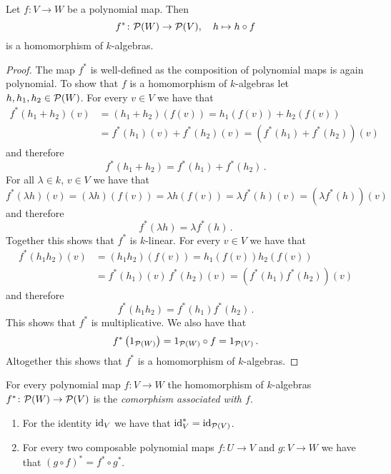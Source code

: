 \begin{lemma}
  Let $f \colon V \to W$ be a polynomial map. Then
  \[
            f^*
    \colon  \mathcal{P}(W)
    \to     \mathcal{P}(V),
    \quad   h
    \mapsto h \circ f
  \]
  is a homomorphism of $k$-algebras.
\end{lemma}
\begin{proof}
  The map $f^*$ is well-defined as the composition of polynomial maps is again polynomial.
  To show that $f$ is a homomorphism of $k$-algebras let $h, h_1, h_2 \in \mathcal{P}(W)$.
  For every $v \in V$ we have that
  \begin{align*}
        f^*(h_1+h_2)(v)
    &=  (h_1 + h_2)(f(v))
     =  h_1(f(v)) + h_2(f(v)) \\
    &=  f^*(h_1)(v) + f^*(h_2)(v)
     =  (f^*(h_1)+f^*(h_2))(v)
  \end{align*}
  and therefore
  \[
      f^*(h_1 + h_2)
    = f^*(h_1) + f^*(h_2) \,.
  \]
  For all $\lambda \in k$, $v \in V$ we have that
  \[
      f^*(\lambda h)(v)
    = (\lambda h)(f(v))
    = \lambda h(f(v))
    = \lambda f^*(h)(v)
    = (\lambda f^*(h))(v)
  \]
  and therefore
  \[
      f^*(\lambda h)
    = \lambda f^*(h) \,.
  \]
  Together this shows that $f^*$ is $k$-linear.
  For every $v \in V$ we have that
  \begin{align*}
        f^*(h_1 h_2)(v)
    &=  (h_1 h_2)(f(v))
     =  h_1(f(v)) h_2(f(v)) \\
    &=  f^*(h_1)(v) \, f^*(h_2)(v)
     =  (f^*(h_1) f^*(h_2))(v)
  \end{align*}
  and therefore
  \[
      f^*(h_1 h_2)
    = f^*(h_1) f^*(h_2) \,.
  \]
  This shows that $f^*$ is multiplicative.
  We also have that
  \[
      f^*\left( 1_{\mathcal{P}(W)} \right)
    = 1_{\mathcal{P}(W)} \circ f
    = 1_{\mathcal{P}(V)} \,.
  \]
  Altogether this shows that $f^*$ is a homomorphism of $k$-algebras.
\end{proof}


\begin{definition}
  For every polynomial map $f \colon V \to W$ the homomorphism of $k$-algebras $f^* \colon \mathcal{P}(W) \to \mathcal{P}(V)$ is the \emph{comorphism associated with $f$}.
\end{definition}


\begin{lemma}
  \label{lemma: functoriality of polynomial algebra}
  \leavevmode
  \begin{enumerate}
    \item
      For the identity $\operatorname{id}_V$ we have that $\operatorname{id}_V^* = \operatorname{id}_{\mathcal{P}(V)}$.
    \item
      For every two composable polynomial maps $f \colon U \to V$ and $g \colon V \to W$ we have that $(g \circ f)^* = f^* \circ g^*$.
  \end{enumerate}
\end{lemma}


